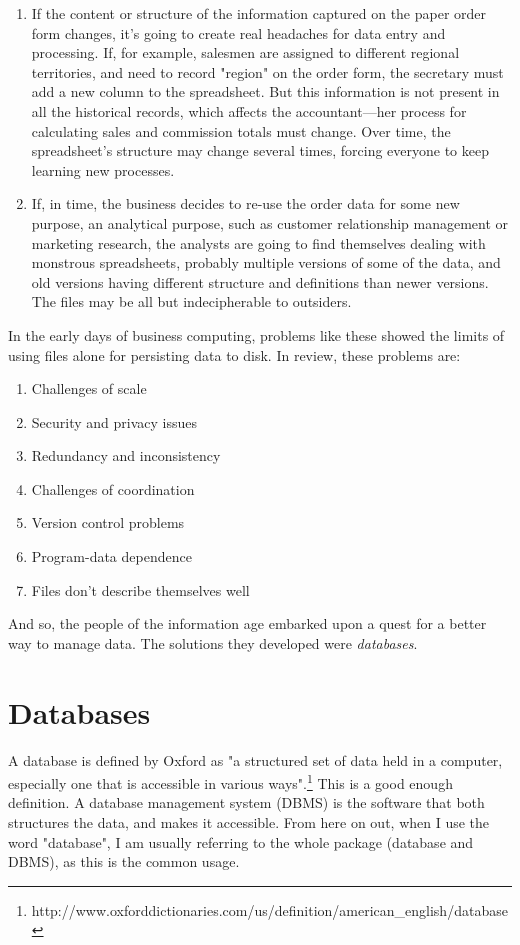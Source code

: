 \documentclass[11pt]{book}
\newcommand{\term}[1]{\emph{#1}} %
\begin{document}
\begin{enumerate}
    \item If the content or structure of the information captured on the paper order form changes, it's going to create real headaches for data entry and processing.  If, for example, salesmen are assigned to different regional territories, and need to record "region" on the order form, the secretary must add a new column to the spreadsheet.  But this information is not present in all the historical records, which affects the accountant---her process for calculating sales and commission totals must change.  Over time, the spreadsheet's structure may change several times, forcing everyone to keep learning new processes.
    \item If, in time, the business decides to re-use the order data for some new purpose, an analytical purpose, such as customer relationship management or marketing research, the analysts are going to find themselves dealing with monstrous spreadsheets, probably multiple versions of some of the data, and old versions having different structure and definitions than newer versions.  The files may be all but indecipherable to outsiders.
\end{enumerate}

In the early days of business computing, problems like these showed the limits of using files alone for persisting data to disk.  In review, these problems are:

\begin{enumerate}
    \item Challenges of scale
    \item Security and privacy issues
    \item Redundancy and inconsistency
    \item Challenges of coordination
    \item Version control problems
    \item Program-data dependence
    \item Files don't describe themselves well
\end{enumerate}

And so, the people of the information age embarked upon a quest for a better way to manage data.  The solutions they developed were \term{databases}.

\section{Databases}

A database is defined by Oxford as "a structured set of data held in a computer, especially one that is accessible in various ways".\footnote{http://www.oxforddictionaries.com/us/definition/american\_english/database}  This is a good enough definition.  A database management system (DBMS) is the software that both structures the data, and makes it accessible.  From here on out, when I use the word "database", I am usually referring to the whole package (database and DBMS), as this is the common usage.
\end{document}
